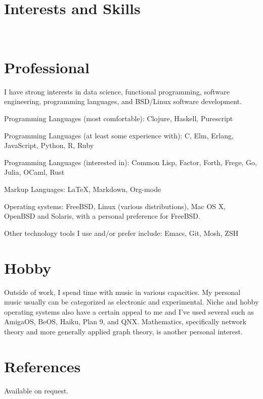 \documentclass[margintitle,line]{res}
\renewcommand{\subsection}[1]{\section{\normalfont #1}}
\begin{document}
\begin{resume}

\section{Interests and Skills}
\ \\
\subsection{Professional}

I have strong interests in data science, functional programming,
software engineering, programming languages, and BSD/Linux software development.

Programming Languages (most comfortable): Clojure, Haskell, Purescript

Programming Languages (at least some experience with): C, Elm, Erlang, JavaScript, Python, R, Ruby

Programming Languages (interested in): Common Lisp, Factor, Forth, Frege, Go, Julia, OCaml, Rust

Markup Languages: LaTeX, Markdown, Org-mode

Operating systems: FreeBSD, Linux (various distributions), Mac OS X, OpenBSD and Solaris,
with a personal preference for FreeBSD.

Other technology tools I use and/or prefer include: Emacs, Git, Mosh, ZSH
\subsection{Hobby}

Outside of work, I spend time with music in various
capacities. My personal music usually can be categorized as electronic
and experimental. Niche and hobby operating systems also have a certain appeal
to me and I've used several such as AmigaOS, BeOS, Haiku, Plan 9, and QNX.
Mathematics, specifically network theory and more generally applied graph
theory, is another personal interest.

\section{References}

Available on request.

\end{resume}
\end{document}
